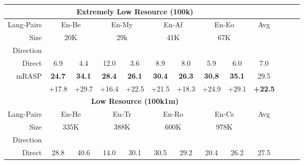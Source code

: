 \documentclass[11pt,a4paper]{article}
\newcommand{\mf}[1]{\multicolumn{2}{c}{ #1}}
\newcommand{\smf}[1]{\multicolumn{2}{c}{#1}}
\newcommand{\method}{mRASP\xspace}
\newcommand{\baseline}{Direct}
\begin{document}
\begin{table*}[htb]
\begin{center}
\begin{tabular}{rcccccccccccc}
\toprule
&\multicolumn{7}{c}{\textbf{Extremely Low Resource (100k)}} \\
\midrule

Lang-Pairs& 
\mf{En-Be} &
\mf{En-My} &
\mf{En-Af} &
\mf{En-Eo} & 
Avg

\\



Size &
\smf{20K}  & 
\smf{29k}  & 
\smf{41K} & 
\smf{67K} & 

\\


Direction & 
  & &

  & &

  & &

  & \\




\midrule
\baseline &
6.9 & 4.4 & 12.0 & 3.6 &  8.9 & 8.0 & 5.9 & 6.0 & 7.0
\\


 \method &
\bf 24.7 & \bf 34.1 &
\bf 28.4 & \bf 26.1 &
\bf 30.4 & \bf 26.3 &
\bf 30.8 & \bf 35.1 &
29.5

\\

  &
 +17.8 & +29.7 &
 +16.4 & +22.5  &
 +21.5 & +18.3 &
 +24.9 & +29.1 &
 \textbf{+22.5}

\\

\midrule
\midrule

&\multicolumn{7}{c}{\textbf{Low Resource (100k1m)}} \\
\midrule


Lang-Pairs &
\mf{En-He} &
\mf{En-Tr} &
\mf{En-Ro} &
\mf{En-Cs} &
Avg
\\


Size &
\smf{335K} & 
\smf{388K} & 
\smf{600K} & 
\smf{978K}
\\


 Direction & 
  & &

  & &

  & &

  & \\




\midrule
 \baseline &
28.8 & 40.6 & 14.0 & 30.1 & 30.5 & 29.2 & 20.4 & 26.2 & 27.5
\\



\end{tabular}
\end{center}
\end{table*}
\end{document}
